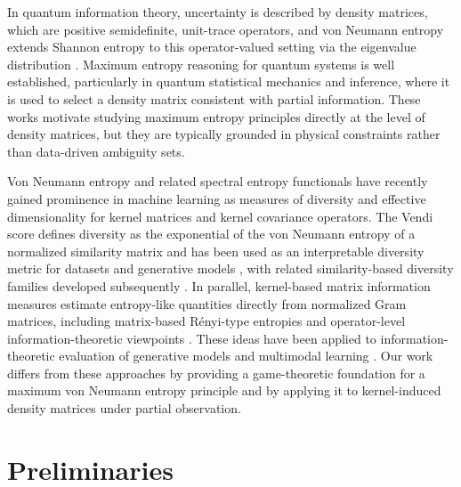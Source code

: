 \documentclass{article}
\theoremstyle{plain}
\theoremstyle{definition}
\begin{document}
In quantum information theory, uncertainty is described by density matrices, which are positive semidefinite, unit-trace operators, and von Neumann entropy extends Shannon entropy to this operator-valued setting via the eigenvalue distribution \cite{vonNeumann1955,NielsenChuang2000}. Maximum entropy reasoning for quantum systems is well established, particularly in quantum statistical mechanics and inference, where it is used to select a density matrix consistent with partial information. These works motivate studying maximum entropy principles directly at the level of density matrices, but they are typically grounded in physical constraints rather than data-driven ambiguity sets.

Von Neumann entropy and related spectral entropy functionals have recently gained prominence in machine learning as measures of diversity and effective dimensionality for kernel matrices and kernel covariance operators. The Vendi score defines diversity as the exponential of the von Neumann entropy of a normalized similarity matrix and has been used as an interpretable diversity metric for datasets and generative models \cite{FriedmanDieng2022Vendi}, with related similarity-based diversity families developed subsequently \cite{pasarkar2024cousins}. In parallel, kernel-based matrix information measures estimate entropy-like quantities directly from normalized Gram matrices, including matrix-based R\'enyi-type entropies and operator-level information-theoretic viewpoints \cite{SanchezGiraldoRaoPrincipe2015,bach2022informationtheorykernelmethods}. These ideas have been applied to information-theoretic evaluation of generative models and multimodal learning \cite{jalali2023information,zhang2024interpretable,ospanov2024towards}. Our work differs from these approaches by providing a game-theoretic foundation for a maximum von Neumann entropy principle and by applying it to kernel-induced density matrices under partial observation.

\section{Preliminaries}
\end{document}

